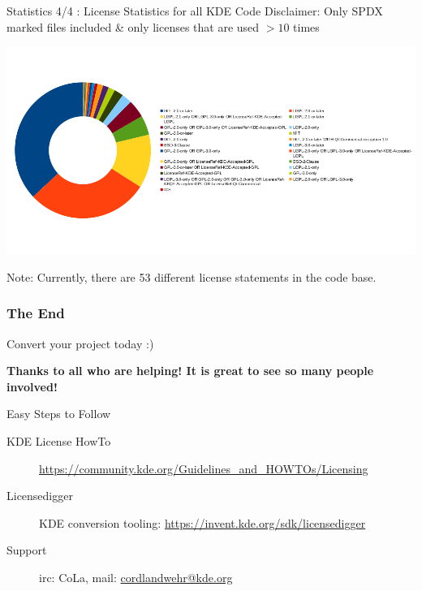 \documentclass[t,compress,aspectratio=169]{beamer}
\begin{document}
\begin{frame}
    {Statistics 4/4 : License Statistics for all KDE Code}
    {Disclaimer: Only SPDX marked files included \& only licenses that are used $> 10$ times}
    
    \vspace{-1.5em}
    \begin{center}
        \includegraphics[height=.7\paperheight]{license-overview}
    \end{center}
    \vspace{-2em}
    
    Note: Currently, there are 53 different license statements in the code base.
\end{frame}

\begin{frame}
    \frametitle{The End}
    \vspace{0.3cm}
    \begin{block}{}
        \centering\begin{Huge}Convert your project today :)\end{Huge}
    \end{block}
    \medskip
    \textbf{Thanks to all who are helping! It is great to see so many people involved!}

    \vspace{0.5cm}
    \begin{tiny}
        \begin{block}{Easy Steps to Follow}
            \begin{description}
                \item [KDE License HowTo] \url{https://community.kde.org/Guidelines_and_HOWTOs/Licensing}
                \item [Licensedigger] KDE conversion tooling: \url{https://invent.kde.org/sdk/licensedigger}
                \item [Support] irc: CoLa, mail: \url{cordlandwehr@kde.org}
            \end{description}
        \end{block}
    \end{tiny}
\end{frame}
\end{document}
